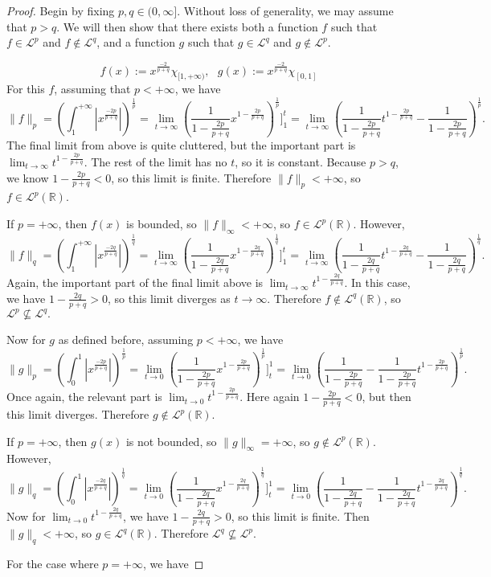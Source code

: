 \documentclass[12pt]{article}
\newcommand{\R}{\mathbb{R}}
\newcommand{\eq}[1]{\begin{equation*}#1\end{equation*}}
\begin{document}
\begin{proof}
    Begin by fixing $p, q \in (0, \infty]$. Without loss of generality, we may assume that $p > q$. We will then show that there exists both a function $f$ such that $f \in \mathcal{L}^p$ and $f \notin \mathcal{L}^q$, and a function $g$ such that $g \in \mathcal{L}^q$ and $g \notin \mathcal{L}^p$.

    \eq{f(x) := x^\frac{-2}{p+q} \chi_{[1, +\infty)}, ~~~g(x) := x^\frac{-2}{p+q} \chi_{[0, 1]}}
    For this $f$, assuming that $p < +\infty$, we have 
    \eq{\|f\|_p = \left( \int_{1}^{+\infty} |x^\frac{-2p}{p+q}|\right)^\frac{1}{p} = \lim_{t \to \infty} \left( \frac{1}{1-\frac{2p}{p+q}} x^{1-\frac{2p}{p+q}} \right)^\frac{1}{p} \Biggr]_1^t = \lim_{t \to \infty} \left(\frac{1}{1-\frac{2p}{p+q}} t^{1-\frac{2p}{p+q}} - \frac{1}{1- \frac{2p}{p+q}}\right)^\frac{1}{p}.}
    The final limit from above is quite cluttered, but the important part is $\lim_{t \to \infty} t^{1-\frac{2p}{p+q}}$. The rest of the limit has no $t$, so it is constant. Because $p > q$, we know $1-\frac{2p}{p+q} < 0$, so this limit is finite. Therefore $\|f\|_p < +\infty$, so $f \in \mathcal{L}^p(\R)$. 
    
    If $p = +\infty$, then $f(x)$ is bounded, so $\|f\|_\infty < +\infty$, so $f \in \mathcal{L}^p(\R)$. However,
    \eq{\|f\|_q = \left( \int_{1}^{+\infty} |x^\frac{-2q}{p+q}|\right)^\frac{1}{q} = \lim_{t \to \infty} \left( \frac{1}{1-\frac{2q}{p+q}} x^{1 - \frac{2q}{p+q}}\right)^\frac{1}{q} \Biggr]_1^t = \lim_{t \to \infty} \left(\frac{1}{1-\frac{2q}{p+q}} t^{1-\frac{2q}{p+q}} - \frac{1}{1- \frac{2q}{p+q}}\right)^\frac{1}{q}.}
    Again, the important part of the final limit above is $\lim_{t \to \infty} t^{1-\frac{2q}{p+q}}$. In this case, we have $1-\frac{2q}{p+q} > 0$, so this limit diverges as $t \to \infty$. Therefore $f \notin \mathcal{L}^q(\R)$, so $\mathcal{L}^p \not\subseteq \mathcal{L}^q.$

    Now for $g$ as defined before, assuming $p < +\infty$, we have
    \eq{\|g\|_p = \left( \int_{0}^{1} |x^\frac{-2p}{p+q}|\right)^\frac{1}{p} = \lim_{t \to 0} \left( \frac{1}{1-\frac{2p}{p+q}} x^{1-\frac{2p}{p+q}} \right)^\frac{1}{p} \Biggr]_t^1 = \lim_{t \to 0} \left(\frac{1}{1- \frac{2p}{p+q}} -\frac{1}{1-\frac{2p}{p+q}} t^{1-\frac{2p}{p+q}}\right)^\frac{1}{p} .}
    Once again, the relevant part is $\lim_{t \to 0} t^{1-\frac{2p}{p+q}}$. Here again $1 - \frac{2p}{p+q} < 0$, but then this limit diverges. Therefore $g \notin \mathcal{L}^p(\R)$. 
    
    If $p = +\infty$, then $g(x)$ is not bounded, so $\|g\|_\infty = + \infty$, so $g \notin \mathcal{L}^p(\R)$. However,
    \eq{\|g\|_q = \left( \int_{0}^{1} |x^\frac{-2q}{p+q}|\right)^\frac{1}{q} = \lim_{t \to 0} \left( \frac{1}{1-\frac{2q}{p+q}} x^{1-\frac{2q}{p+q}} \right)^\frac{1}{q} \Biggr]_t^1 = \lim_{t \to 0} \left(\frac{1}{1- \frac{2q}{p+q}} -\frac{1}{1-\frac{2q}{p+q}} t^{1-\frac{2q}{p+q}}\right)^\frac{1}{q} .}
    Now for $\lim_{t \to 0} t^{1- \frac{2q}{p+q}}$, we have $1- \frac{2q}{p+q} > 0$, so this limit is finite. Then $\|g\|_q < + \infty$, so $g \in \mathcal{L}^q(\R)$. Therefore $\mathcal{L}^q \not\subseteq \mathcal{L}^p$.

    For the case where $p = +\infty$, we have
\end{proof}
\end{document}
